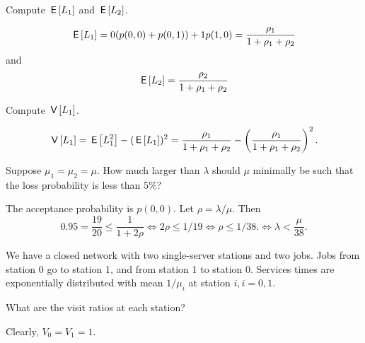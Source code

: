\begin{exercise}[201704]
  Compute  $\,\mathsf{E}\left[L_1\right]$ and $\,\mathsf{E}\left[L_2\right]$.
\begin{solution}
    \begin{equation*}
    \,\mathsf{E}\left[L_1\right] = 0 (p(0,0) + p(0,1)) + 1 p(1,0) = \frac{\rho_1}{1+\rho_1 + \rho_2}
    \end{equation*}
and
    \begin{equation*}
    \,\mathsf{E}\left[L_2\right] = \frac{\rho_2}{1+\rho_1 + \rho_2}
    \end{equation*}
\end{solution}
\end{exercise}

\begin{exercise}[201704]
  Compute  $\,\mathsf{V}\left[L_1\right]$.
\begin{solution}
    \begin{equation*}
      \,\mathsf{V}\left[L_1\right] = \,\mathsf{E}\left[L_1^2\right] - (\,\mathsf{E}\left[L_1\right])^2= \frac{\rho_1}{1+\rho_1 + \rho_2} - \left(\frac{\rho_1}{1+\rho_1 + \rho_2}\right)^2.
    \end{equation*}
\end{solution}
\end{exercise}

\begin{exercise}[201704]
  Suppose $\mu_1=\mu_2=\mu$. How much larger than $\lambda$ should
  $\mu$ minimally be such that the loss probability is less than
  $5\%$?
\begin{solution}
    The acceptance probability is $p(0,0)$. Let $\rho=\lambda/\mu$. Then
    \begin{equation*}
      0.95 =\frac{19}{20}\leq \frac1{1+2\rho} \iff 2\rho \leq 1/19 \iff \rho \leq 1/38.
    \iff \lambda < \frac{\mu}{38}.
\end{equation*}
\end{solution}
\end{exercise}


We have a closed network with two single-server stations and two jobs. Jobs from station 0 go to station 1, and from station 1 to station 0.  Services times are exponentially distributed with mean $1/\mu_i$ at station $i, i=0,1$.

\begin{exercise}[201704]
What are the visit ratios at each station?
\begin{solution}
  Clearly, $V_0=V_1=1$.
\end{solution}
\end{exercise}

